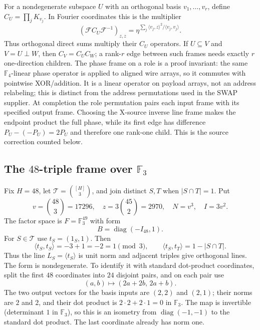For a nondegenerate subspace $U$ with an orthogonal basis
$v_1,\ldots,v_r$, define $C_U=\prod_jK_{v_j}$. In Fourier coordinates
this is the multiplier
\[
 (\mathcal F C_U\mathcal F^{-1})_{z,z}
   =\eta^{\sum_j\langle v_j,z\rangle^2/\langle v_j,v_j\rangle}.
                                                               \tag{A.3a}
\]
Thus orthogonal direct sums multiply their $C_U$ operators. If
$U\subseteq V$ and $V=U\perp W$, then $C_V=C_UC_W$; a rank-$r$
edge between such frames needs exactly $r$ one-direction children.
The phase frame on a role is a proof invariant: the same $\mathbb F_4$-linear
phase operator is applied to aligned wire arrays, so it commutes with
pointwise XOR/addition. It is a linear operator on payload arrays, not an
address relabeling; this is distinct from the address permutations used
in the SWAP supplier.
At completion the role permutation pairs each input frame with its
specified output frame. Choosing the X-source inverse line frame makes
the endpoint product the full phase, while its first edge has difference
$P_U-(-P_U)=2P_U$ and therefore one rank-one child. This is the source
correction counted below.

\subsection{The $48$-triple frame over $\mathbb F_3$}

Fix $H=48$, let $\mathcal T=\binom{[H]}3$, and join distinct $S,T$ when
$|S\cap T|=1$. Put
\[
 v=\binom{48}{3}=17296,\quad
 z=3\binom{45}{2}=2970,\quad N=v^3,\quad I=3v^2.
\]
The factor space is $F=\mathbb F_3^{49}$ with form
\[
 B=\operatorname{diag}(-I_{48},1).
\]
For $S\in\mathcal T$ use $t_S=(1_S,1)$. Then
\[
 \langle t_S,t_S\rangle=-3+1=-2=1\pmod 3,
 \qquad \langle t_S,t_T\rangle=1-|S\cap T|.
\]
Thus the line $L_S=\langle t_S\rangle$ is unit norm and adjacent triples
give orthogonal lines. The form is nondegenerate. To identify it with
standard dot-product coordinates, split the first $48$ coordinates into
$24$ disjoint pairs, and on each pair use
\[
 (a,b)\longmapsto(2a+2b,\,2a+b).
\]
The two output vectors for the basis inputs are $(2,2)$ and $(2,1)$;
their norms are $2$ and $2$, and their dot product is $2\cdot2+2\cdot1
=0$ in $\mathbb F_3$. The map is invertible (determinant $1$ in $\mathbb F_3$), so this is
an isometry from $\operatorname{diag}(-1,-1)$ to the standard dot
product. The last coordinate already has norm one.


